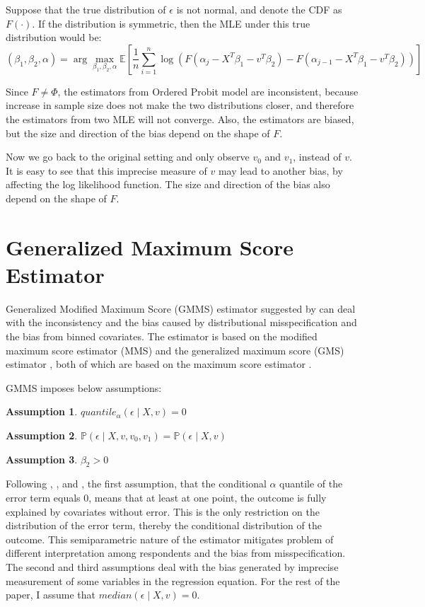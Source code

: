 \documentclass{article}
\newtheorem{assumption}{Assumption}
\begin{document}
Suppose that the true distribution of $\epsilon$ is not normal, and denote the CDF as $F(\cdot)$. If the distribution is symmetric, then the MLE under this true distribution would be:
$$
    (\beta_{1}, \beta_{2}, \alpha) = \arg\max_{\beta_{1}, \beta_{2}, \alpha} \mathbb{E}\left[\frac{1}{n} \sum_{i=1}^{n} \log \left( F(\alpha_{j} - X^{T}\beta_{1} - v^{T}\beta_{2}) - F(\alpha_{j-1} - X^{T}\beta_{1} - v^{T}\beta_{2}) \right) \right]
$$ 

Since $F \neq \Phi$, the estimators from Ordered Probit model are inconsistent, because increase in sample size does not make the two distributions closer, and therefore the estimators from two MLE will not converge. Also, the estimators are biased, but the size and direction of the bias depend on the shape of $F$. 

Now we go back to the original setting and only observe $v_{0}$ and $v_{1}$, instead of $v$. It is easy to see that this imprecise measure of $v$ may lead to another bias, by affecting the log likelihood function. The size and direction of the bias also depend on the shape of $F$.

\section{Generalized Maximum Score Estimator}
Generalized Modified Maximum Score (GMMS) estimator suggested by \citet{Wang2022a} can deal with the inconsistency and the bias caused by distributional misspecification and the bias from binned covariates. The estimator is based on the modified maximum score estimator (MMS) \citep{Manski2002a} and the generalized maximum score (GMS) estimator \citep{Lee1992a}, both of which are based on the maximum score estimator \citep{Manski1975a}.

GMMS imposes below assumptions:

\begin{assumption}
    $quantile_{\alpha}(\epsilon \mid X, v) = 0$
\end{assumption}

\begin{assumption}
    $\mathbb{P}\left(\epsilon \mid X, v, v_{0}, v_{1}\right) = \mathbb{P}\left(\epsilon \mid X, v\right)$
\end{assumption}

\begin{assumption}
    $\beta_{2} > 0$
\end{assumption}

Following \citet{Manski1985a}, \citet{Horowitz1992a}, and \citet{Lee1992a}, the first assumption, that the conditional $\alpha$ quantile of the error term equals $0$,  means that at least at one point, the outcome is fully explained by covariates without error. This is the only restriction on the distribution of the error term, thereby the conditional distribution of the outcome. This semiparametric nature of the estimator mitigates problem of different interpretation among respondents and the bias from misspecification. The second and third assumptions deal with the bias generated by imprecise measurement of some variables in the regression equation. For the rest of the paper, I assume that $median(\epsilon \mid X, v) = 0$. 
\end{document}
